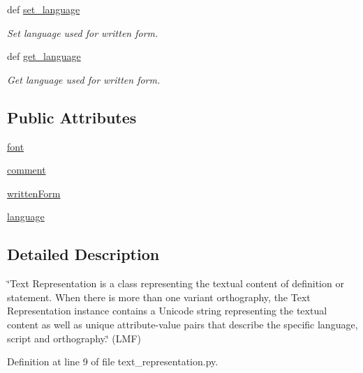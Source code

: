 \begin{DoxyCompactItemize}
def \hyperlink{classlmf_1_1src_1_1core_1_1text__representation_1_1_text_representation_a00be4c8e0a058f9df2605abb27ac8853}{set\+\_\+language}
\begin{DoxyCompactList}\small\item\em Set language used for written form. \end{DoxyCompactList}\item 
def \hyperlink{classlmf_1_1src_1_1core_1_1text__representation_1_1_text_representation_a1ec2b944809b0503bc1bb07b034eef5b}{get\+\_\+language}
\begin{DoxyCompactList}\small\item\em Get language used for written form. \end{DoxyCompactList}\end{DoxyCompactItemize}
\subsection*{Public Attributes}
\begin{DoxyCompactItemize}
\item 
\hyperlink{classlmf_1_1src_1_1core_1_1text__representation_1_1_text_representation_a78df11b119c24be8b18e6f121e0bb802}{font}
\item 
\hyperlink{classlmf_1_1src_1_1core_1_1text__representation_1_1_text_representation_af0026ed9d19dd869b408fba84f6fa5b1}{comment}
\item 
\hyperlink{classlmf_1_1src_1_1core_1_1text__representation_1_1_text_representation_a029a488706154d5fe42ecbea00974780}{written\+Form}
\item 
\hyperlink{classlmf_1_1src_1_1core_1_1text__representation_1_1_text_representation_aba23f79743bc4aa642f344aec09a3807}{language}
\end{DoxyCompactItemize}


\subsection{Detailed Description}
\char`\"{}\+Text Representation is a class representing the textual content of definition or statement. When there is more than one variant orthography, the Text Representation instance contains a Unicode string representing the textual content as well as unique attribute-\/value pairs that describe the specific language, script and orthography.\char`\"{} (L\+M\+F) 

Definition at line 9 of file text\+\_\+representation.\+py.



